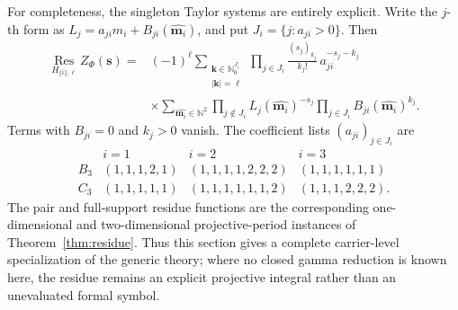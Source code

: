 \documentclass[11pt]{article}
\renewcommand{\boxed}[1]{#1}
\newcommand{\N}{\mathbb N}
\newcommand{\Nzero}{\mathbb N_0}
\newcommand{\Res}{\operatorname*{Res}}
\begin{document}
For completeness, the singleton Taylor systems are entirely explicit.
Write the \(j\)-th form as
\(L_j=a_{ji}m_i+B_{ji}(\widehat{\mathbf m_i})\), and put
\(J_i=\{j:a_{ji}>0\}\).  Then
\begin{equation}\label{eq:B3C3-singleton}
\boxed{
\begin{aligned}
 \Res_{H_{\{i\},\ell}}Z_\Phi(\mathbf s)
 ={}&(-1)^\ell
 \sum_{\substack{\mathbf k\in\Nzero^{J_i}\\|\mathbf k|=\ell}}
 \prod_{j\in J_i}
 \frac{(s_j)_{k_j}}{k_j!}\,a_{ji}^{-s_j-k_j}\\
 &\times
 \sum_{\widehat{\mathbf m_i}\in\N^2}
 \prod_{j\notin J_i}L_j(\widehat{\mathbf m_i})^{-s_j}
 \prod_{j\in J_i}B_{ji}(\widehat{\mathbf m_i})^{k_j}.
\end{aligned}}
\end{equation}
Terms with \(B_{ji}=0\) and \(k_j>0\) vanish.  The coefficient lists
\((a_{ji})_{j\in J_i}\) are
\begin{equation}\label{eq:B3C3-singleton-coeffs}
\begin{array}{c|ccc}
& i=1&i=2&i=3\\ \hline
B_3&(1,1,1,2,1)&(1,1,1,1,2,2,2)&(1,1,1,1,1,1)\\
C_3&(1,1,1,1,1)&(1,1,1,1,1,1,2)&(1,1,1,2,2,2).
\end{array}
\end{equation}
The pair and full-support residue functions are the corresponding
one-dimensional and two-dimensional projective-period instances of
Theorem~\ref{thm:residue}.  Thus this section gives a complete
carrier-level specialization of the generic theory; where no closed
gamma reduction is known here, the residue remains an explicit
projective integral rather than an unevaluated formal symbol.
\end{document}
